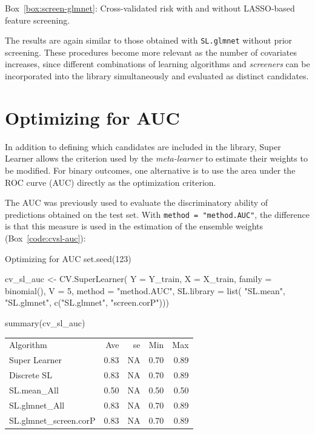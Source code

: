 \documentclass[12pt]{article}
\newcommand{\routputcaption}[2]{%
    \par\smallskip
    \begin{center}
        Box~\ref{#1}: #2
    \end{center}
}
\begin{document}
\routputcaption{box:screen-glmnet}
{Cross-validated risk with and without LASSO-based feature screening.}

The results are again similar to those obtained with \texttt{SL.glmnet} without prior screening. These procedures become more relevant as the number of covariates increases, since different combinations of learning algorithms and \textit{screeners} can be incorporated into the library simultaneously and evaluated as distinct candidates.

\section{Optimizing for AUC}

In addition to defining which candidates are included in the library, Super Learner allows the criterion used by the \textit{meta-learner} to estimate their weights to be modified. For binary outcomes, one alternative is to use the area under the ROC curve (AUC) directly as the optimization criterion.

The AUC was previously used to evaluate the discriminatory ability of predictions obtained on the test set. With \texttt{method = "method.AUC"}, the difference is that this measure is used in the estimation of the ensemble weights (Box~\ref{code:cvsl-auc}):

\begin{rcode}[label={code:cvsl-auc}]{Optimizing for AUC}
	set.seed(123)
	
	cv_sl_auc <- CV.SuperLearner(
	Y = Y_train, X = X_train,
	family = binomial(),
	V = 5,
	method = "method.AUC",
	SL.library = list(
	"SL.mean",
	"SL.glmnet",
	c("SL.glmnet", "screen.corP")))
	
	summary(cv_sl_auc)
\end{rcode}

\begin{routputboxref}[label={box:auc-method}]
	\ttfamily
	\centering
	\begin{tabular}{lrrrr}
		Algorithm & Ave & se & Min & Max \\
		Super Learner & 0.83 & NA & 0.70 & 0.89 \\
		Discrete SL & 0.83 & NA & 0.70 & 0.89 \\
		SL.mean\_All & 0.50 & NA & 0.50 & 0.50 \\
		SL.glmnet\_All & 0.83 & NA & 0.70 & 0.89 \\
		SL.glmnet\_screen.corP & 0.83 & NA & 0.70 & 0.89 \\
	\end{tabular}
\end{routputboxref}
\end{document}
